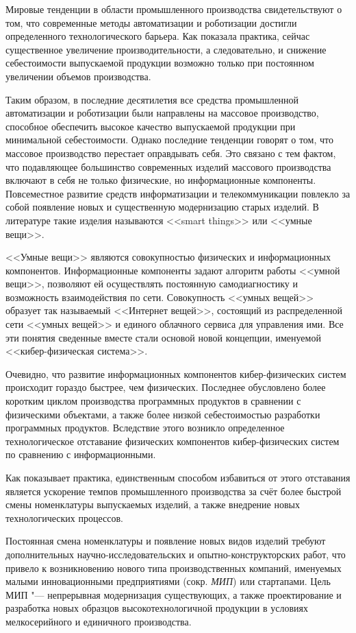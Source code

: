 
{\actuality} Мировые тенденции в области промышленного производства свидетельствуют о том, что современные методы автоматизации и роботизации достигли определенного технологического барьера. Как показала практика, сейчас существенное увеличение производительности, а следовательно, и снижение себестоимости выпускаемой продукции возможно только при постоянном увеличении объемов производства.

Таким образом, в последние десятилетия все средства промышленной автоматизации и роботизации были направлены на массовое производство, способное обеспечить высокое качество выпускаемой продукции при минимальной себестоимости. Однако последние тенденции говорят о том, что массовое производство перестает оправдывать себя. Это связано с тем фактом, что подавляющее большинство современных изделий массового производства включают в себя не только физические, но информационные компоненты. Повсеместное развитие средств информатизации и телекоммуникации повлекло за собой появление новых и существенную модернизацию старых изделий. В литературе такие изделия называются <<smart things>> или <<умные вещи>>. 

<<Умные вещи>> являются совокупностью физических и информационных компонентов. Информационные компоненты задают алгоритм работы <<умной вещи>>, позволяют ей осуществлять постоянную самодиагностику и возможность взаимодействия по сети.  Совокупность <<умных вещей>> образует так называемый <<Интернет вещей>>, состоящий из распределенной сети <<умных вещей>> и единого облачного сервиса для управления ими. Все эти понятия сведенные вместе стали основой новой концепции, именуемой <<кибер-физическая система>>.

Очевидно, что развитие информационных компонентов кибер-физических систем происходит гораздо быстрее, чем физических. Последнее обусловлено более коротким циклом производства программных продуктов в сравнении с физическими объектами, а также более низкой себестоимостью разработки программных продуктов. Вследствие этого возникло определенное технологическое отставание физических компонентов кибер-физических систем по сравнению с информационными.

Как показывает практика, единственным способом избавиться от этого отставания является ускорение темпов промышленного производства за счёт более быстрой смены номенклатуры выпускаемых изделий, а также внедрение новых технологических процессов.

Постоянная смена номенклатуры и появление новых видов изделий требуют дополнительных научно-исследовательских и опытно-конструкторских работ, что привело к возникновению нового типа производственных компаний, именуемых малыми инновационными предприятиями (сокр. \textit{МИП}) или стартапами. Цель МИП "--- непрерывная модернизация существующих, а также проектирование и разработка новых образцов высокотехнологичной продукции в условиях мелкосерийного и единичного производства.

